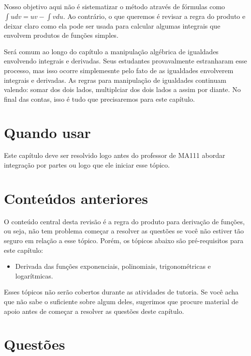 \documentclass[main_estudante.tex]{subfiles}
\begin{document}
Nosso objetivo aqui não é sistematizar o método através de fórmulas como $\int udv=uv-\int vdu$. Ao contrário, o que queremos é revisar a regra do produto e deixar claro como ela pode ser usada para calcular algumas integrais que envolvem produtos de funções simples.

Será comum ao longo do capítulo a manipulação algébrica de igualdades envolvendo integrais e derivadas. Seus estudantes provavalmente estranharam esse processo, mas isso ocorre simplemesnte pelo fato de as igualdades envolverem integrais e derivadas. As regras para manipulação de igualdades continuam valendo: somar dos dois lados, multiplciar dos dois lados a assim por diante. No final das contas, isso é tudo que precisaremos para este capítulo.

\paraAmbos

\section{Quando usar}

Este capítulo deve ser resolvido logo antes do professor de MA111 abordar integração por partes ou logo que ele iniciar esse tópico.

\section{Conteúdos anteriores}

O conteúdo central desta revisão é a regra do produto para derivação de funções, ou seja, não tem problema começar a resolver as questões se você não estiver tão seguro em relação a esse tópico. Porém, os tópicos abaixo são pré-requisitos para este capítulo:

\begin{itemize}
 \item Derivada das funções exponenciais, polinomiais, trigonométricas e logarítmicas.
\end{itemize}

Esses tópicos não serão cobertos durante as atividades de tutoria. Se você acha que não sabe o suficiente sobre algum deles, sugerimos que procure material de apoio antes de começar a resolver as questões deste capítulo.

\newpage

\section{Questões}
\end{document}
